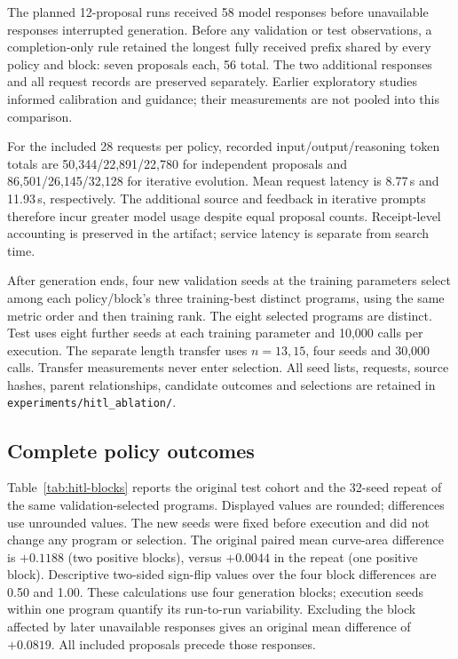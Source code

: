 The planned 12-proposal runs received 58 model responses before
unavailable responses interrupted generation. Before any validation or
test observations, a completion-only rule retained the longest fully
received prefix shared by every policy and block: seven proposals each,
56 total. The two additional responses and all request records are
preserved separately. Earlier exploratory studies informed calibration
and guidance; their measurements are not pooled into this comparison.

For the included 28 requests per policy, recorded input/output/reasoning
token totals are 50,344/22,891/22,780 for independent proposals and
86,501/26,145/32,128 for iterative evolution. Mean request latency is
8.77\,s and 11.93\,s, respectively. The additional source and feedback
in iterative prompts therefore incur greater model usage despite equal
proposal counts. Receipt-level accounting is preserved in the artifact; service latency
is separate from search time.

After generation ends, four new validation seeds at the training
parameters select among each policy/block's three training-best distinct
programs, using the same metric order and then training rank. The eight
selected programs are distinct. Test uses eight further seeds at each
training parameter and 10,000 calls per execution. The separate length
transfer uses $n=13,15$, four seeds and 30,000 calls. Transfer measurements
never enter selection. All seed lists, requests, source hashes, parent
relationships, candidate outcomes and selections are retained in
\texttt{experiments/hitl\_ablation/}.

\subsection{Complete policy outcomes}\label{app:hitl-outcomes}
Table~\ref{tab:hitl-blocks} reports the original test cohort and the
32-seed repeat of the same validation-selected programs. Displayed values
are rounded; differences use unrounded values. The new seeds
were fixed before execution and did not change any program or selection.
The original paired mean curve-area difference is $+0.1188$ (two positive
blocks), versus $+0.0044$ in the repeat (one positive block). Descriptive
two-sided sign-flip values over the four block differences are 0.50 and
1.00. These calculations use four generation blocks; execution seeds
within one program quantify its run-to-run variability. Excluding the
block affected by later unavailable responses gives an original mean
difference of $+0.0819$. All included proposals precede those responses.

